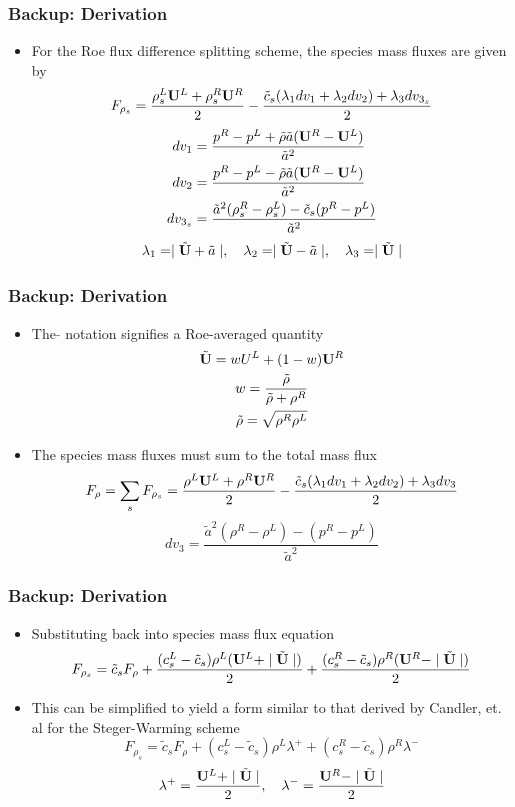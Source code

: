 \documentclass{beamer}
\begin{document}
\begin{frame}
  \frametitle{Backup: Derivation}
  \begin{itemize}
    \item For the Roe flux difference splitting scheme, the species mass fluxes are given by
  \[
  	F_{\rho_s} = \frac{\rho_s^L{\mathbf U}^L+\rho_s^R{\mathbf U}^R}{2}
  	-\frac{\tilde{c}_s(\lambda_1 dv_1 + \lambda_2 dv_2)+\lambda_3 dv_{3_s}}{2}
  \]
  \begin{align*}	
  		dv_1 &= \frac{p^R-p^L+\tilde{\rho} \tilde{a}
      ({\mathbf U}^R-{\mathbf U}^L)}{\tilde{a}^2} \\
  		dv_2 &= \frac{p^R-p^L-\tilde{\rho} \tilde{a}
      ({\mathbf U}^R-{\mathbf U}^L)}{\tilde{a}^2} \\
  		dv_{3_s} &= \frac{\tilde{a}^2 (\rho_s^R-\rho_s^L)- \tilde{c}_s (p^R-p^L)}{\tilde{a}^2}
  \end{align*}
  \begin{align*}
  	\lambda_1 = \mid \tilde{\mathbf U}+\tilde{a} \mid,\quad 
  	\lambda_2 = \mid \tilde{\mathbf U}-\tilde{a} \mid,\quad 
  	\lambda_3 = \mid \tilde{\mathbf U} \mid
  \end{align*}
  \end{itemize}
\end{frame}
\begin{frame}
  \frametitle{Backup: Derivation}
  \begin{itemize}
    \item The $\tilde{}$ notation signifies a Roe-averaged quantity
    \begin{gather*}
    	\tilde{{\mathbf U}} =w{U}^L+(1-w){\mathbf U}^R \\
    	w = \frac{\tilde{\rho}}{\tilde{\rho}+\rho^R} \\
    	\tilde{\rho} = \sqrt{\rho^R\rho^L}
    \end{gather*}
    \item The species mass fluxes must sum to the total mass flux
    \[ F_\rho = \sum\limits_{s}{F_{\rho_s}} =
      \frac{\rho^L{\mathbf U}^L+\rho^R{\mathbf U}^R}{2}
    	-\frac{\tilde{c}_s(\lambda_1 dv_1 + \lambda_2 dv_2)+\lambda_3 dv_3}{2} \]
    \[ dv_3 = \frac{\tilde{a}^2 (\rho^R-\rho^L)-(p^R-p^L)}{\tilde{a}^2} \]
  \end{itemize}
\end{frame}
\begin{frame}
  \frametitle{Backup: Derivation}
  \begin{itemize}
    \item Substituting back into species mass flux equation
    \[
      F_{\rho_s} =\tilde{c}_s F_\rho +
      \frac{(c_s^L-\tilde{c}_s)\rho^L({\mathbf U}^L+\mid \tilde{\mathbf U}\mid)}{2} +
      \frac{(c_s^R-\tilde{c}_s)\rho^R({\mathbf U}^R-\mid \tilde{\mathbf U}\mid)}{2}
    \]
  \item This can be simplified to yield a form similar to that derived by
    Candler, et. al for the Steger-Warming scheme
  \[
    F_{\rho_s} =\tilde{c}_s F_\rho +
    (c_s^L-\tilde{c}_s)\rho^L\lambda^+ + (c_s^R-\tilde{c}_s)\rho^R\lambda^-
  \]
  \[
    \lambda^+ = \frac{{\mathbf U}^L+\mid
    \tilde{\mathbf U}\mid}{2}, \quad \lambda^- = \frac{{\mathbf U}^R-\mid
    \tilde{\mathbf U}\mid}{2}
  \]
  \end{itemize}
\end{frame}
\end{document}
